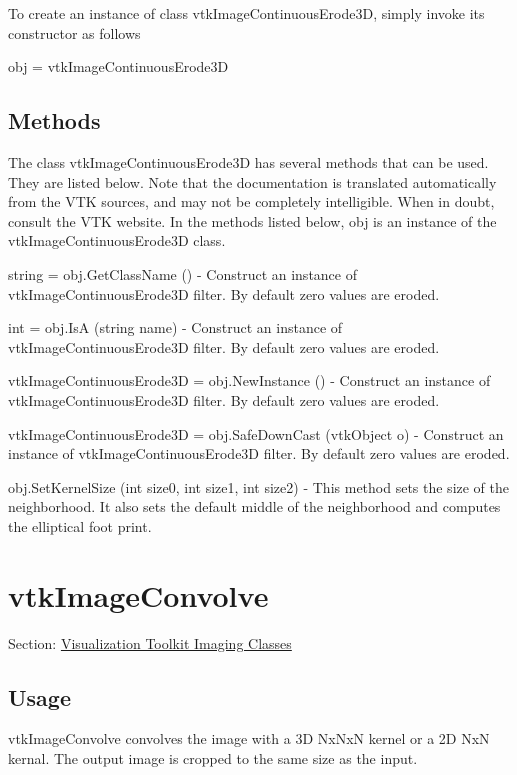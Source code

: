 To create an instance of class vtk\-Image\-Continuous\-Erode3\-D, simply invoke its constructor as follows \begin{DoxyVerb}  obj = vtkImageContinuousErode3D
\end{DoxyVerb}
 \hypertarget{vtkwidgets_vtkxyplotwidget_Methods}{}\subsection{Methods}\label{vtkwidgets_vtkxyplotwidget_Methods}
The class vtk\-Image\-Continuous\-Erode3\-D has several methods that can be used. They are listed below. Note that the documentation is translated automatically from the V\-T\-K sources, and may not be completely intelligible. When in doubt, consult the V\-T\-K website. In the methods listed below, {\ttfamily obj} is an instance of the vtk\-Image\-Continuous\-Erode3\-D class. 
\begin{DoxyItemize}
\item {\ttfamily string = obj.\-Get\-Class\-Name ()} -\/ Construct an instance of vtk\-Image\-Continuous\-Erode3\-D filter. By default zero values are eroded.  
\item {\ttfamily int = obj.\-Is\-A (string name)} -\/ Construct an instance of vtk\-Image\-Continuous\-Erode3\-D filter. By default zero values are eroded.  
\item {\ttfamily vtk\-Image\-Continuous\-Erode3\-D = obj.\-New\-Instance ()} -\/ Construct an instance of vtk\-Image\-Continuous\-Erode3\-D filter. By default zero values are eroded.  
\item {\ttfamily vtk\-Image\-Continuous\-Erode3\-D = obj.\-Safe\-Down\-Cast (vtk\-Object o)} -\/ Construct an instance of vtk\-Image\-Continuous\-Erode3\-D filter. By default zero values are eroded.  
\item {\ttfamily obj.\-Set\-Kernel\-Size (int size0, int size1, int size2)} -\/ This method sets the size of the neighborhood. It also sets the default middle of the neighborhood and computes the elliptical foot print.  
\end{DoxyItemize}\hypertarget{vtkimaging_vtkimageconvolve}{}\section{vtk\-Image\-Convolve}\label{vtkimaging_vtkimageconvolve}
Section\-: \hyperlink{sec_vtkimaging}{Visualization Toolkit Imaging Classes} \hypertarget{vtkwidgets_vtkxyplotwidget_Usage}{}\subsection{Usage}\label{vtkwidgets_vtkxyplotwidget_Usage}
vtk\-Image\-Convolve convolves the image with a 3\-D Nx\-Nx\-N kernel or a 2\-D Nx\-N kernal. The output image is cropped to the same size as the input.

